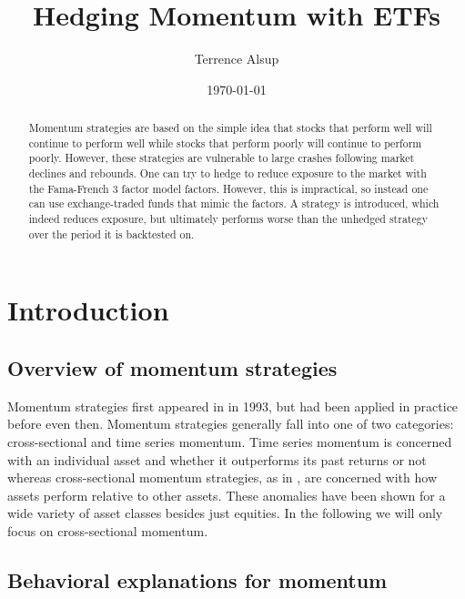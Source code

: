 \documentclass[10pt, letterpaper]{article}
\title{Hedging Momentum with ETFs}
\author{Terrence Alsup}
\date{\today}
\begin{document}
\maketitle

\begin{abstract}
Momentum strategies are based on the simple idea that stocks that perform well will continue to perform well while stocks that perform poorly will continue to perform poorly.  However, these strategies are vulnerable to large crashes following market declines and rebounds.  One can try to hedge to reduce exposure to the market with the Fama-French 3 factor model factors.  However, this is impractical, so instead one can use exchange-traded funds that mimic the factors.  A strategy is introduced, which indeed reduces exposure, but ultimately performs worse than the unhedged strategy over the period it is backtested on.
\end{abstract}


\section{Introduction}

\subsection{Overview of momentum strategies}

Momentum strategies first appeared in \cite{JT} in 1993, but had been applied in practice before even then.  Momentum strategies generally fall into one of two categories: cross-sectional and time series momentum.  Time series momentum is concerned with an individual asset and whether it outperforms its past returns or not \cite{MOP} whereas cross-sectional momentum strategies, as in \cite{JT}, are concerned with how assets perform relative to other assets.  These anomalies have been shown for a wide variety of asset classes besides just equities.  In the following we will only focus on cross-sectional momentum.


\subsection{Behavioral explanations for momentum}
\end{document}
